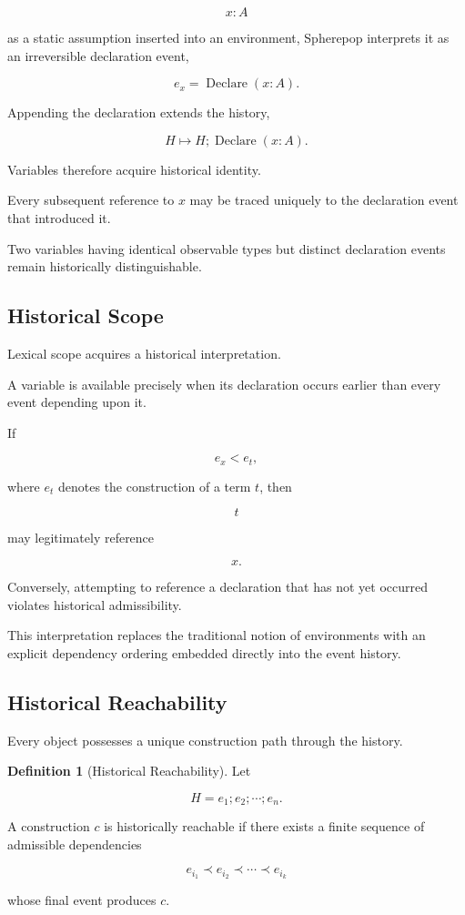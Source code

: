 \documentclass[12pt,oneside]{article}
\theoremstyle{definition}
\newtheorem{definition}[theorem]{Definition}
\theoremstyle{remark}
\begin{document}
\[
x:A
\]

as a static assumption inserted into an environment, Spherepop interprets it as
an irreversible declaration event,

\[
e_x
=
\operatorname{Declare}(x:A).
\]

Appending the declaration extends the history,

\[
H
\longmapsto
H;
\operatorname{Declare}(x:A).
\]

Variables therefore acquire historical identity.

Every subsequent reference to \(x\) may be traced uniquely to the declaration
event that introduced it.

Two variables having identical observable types but distinct declaration events
remain historically distinguishable.

\subsection{Historical Scope}

Lexical scope acquires a historical interpretation.

A variable is available precisely when its declaration occurs earlier than every
event depending upon it.

If

\[
e_x
<
e_t,
\]

where \(e_t\) denotes the construction of a term \(t\), then

\[
t
\]

may legitimately reference

\[
x.
\]

Conversely, attempting to reference a declaration that has not yet occurred
violates historical admissibility.

This interpretation replaces the traditional notion of environments with an
explicit dependency ordering embedded directly into the event history.

\subsection{Historical Reachability}

Every object possesses a unique construction path through the history.

\begin{definition}[Historical Reachability]

Let

\[
H=e_1;e_2;\cdots;e_n.
\]

A construction \(c\) is historically reachable if there exists a finite sequence
of admissible dependencies

\[
e_{i_1}
\prec
e_{i_2}
\prec
\cdots
\prec
e_{i_k}
\]

whose final event produces \(c\).

\end{definition}
\end{document}
